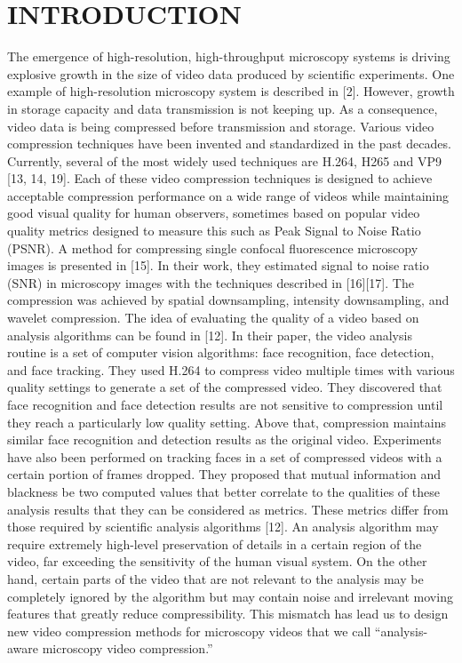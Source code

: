 \section{INTRODUCTION}
The emergence of high-resolution, high-throughput microscopy systems is driving explosive growth in the size of video data produced by scientific experiments. One example of high-resolution microscopy system is described in [2]. However, growth in storage capacity and data transmission is not keeping up. As a consequence, video data is being compressed before transmission and storage.
Various video compression techniques have been invented and standardized in the past decades. Currently, several of the most widely used techniques are H.264, H265 and VP9 [13, 14, 19]. Each of these video compression techniques is designed to achieve acceptable compression performance on a wide range of videos while maintaining good visual quality for human observers, sometimes based on popular video quality metrics designed to measure this such as Peak Signal to Noise Ratio (PSNR).
A method for compressing single confocal fluorescence microscopy images is presented in [15]. In their work, they estimated signal to noise ratio (SNR) in microscopy images with the techniques described in [16][17]. The compression was achieved by spatial downsampling, intensity downsampling, and wavelet compression.
The idea of evaluating the quality of a video based on analysis algorithms can be found in [12]. In their paper, the video analysis routine is a set of computer vision algorithms: face recognition, face detection, and face tracking. They used H.264 to compress video multiple times with various quality settings to generate a set of the compressed video. They discovered that face recognition and face detection results are not sensitive to compression until they reach a particularly low quality setting. Above that, compression maintains similar face recognition and detection results as the original video. Experiments have also been performed on tracking faces in a set of compressed videos with a certain portion of frames dropped. They proposed that mutual information and blackness be two computed values that better correlate to the qualities of these analysis results that they can be considered as metrics.
These metrics differ from those required by scientific analysis algorithms [12]. An analysis algorithm may require extremely high-level preservation of details in a certain region of the video, far exceeding the sensitivity of the human visual system. On the other hand, certain parts of the video that are not relevant to the analysis may be completely ignored by the algorithm but may contain noise and irrelevant moving features that greatly reduce compressibility. This mismatch has lead us to design new video compression methods for microscopy videos that we call “analysis-aware microscopy video compression.”
